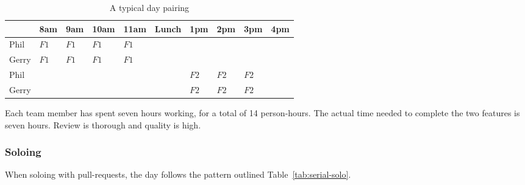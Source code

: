 \documentclass[letterpaper]{article}
\theoremstyle{definition}
\begin{document}
    \begin{table}[h]
        \centering
        \tiny
        \begin{tabular}{ |l|l|l|l|l|l|l|l|l|l| }
            \hline
            & 8am                     & 9am                     & 10am                    & 11am                    & Lunch & 1pm                    & 2pm                    & 3pm                    & 4pm \\
            \hline
            Phil  & \cellcolor{blue!10}$F1$ & \cellcolor{blue!10}$F1$ & \cellcolor{blue!10}$F1$ & \cellcolor{blue!10}$F1$ &       &      &      &      &     \\
            \hline
            Gerry & \cellcolor{blue!10}$F1$ & \cellcolor{blue!10}$F1$ & \cellcolor{blue!10}$F1$ & \cellcolor{blue!10}$F1$ &       &      &      &      &     \\
            \hline
            Phil  &                         &                         &                         &                         &       & \cellcolor{red!10}$F2$ & \cellcolor{red!10}$F2$ & \cellcolor{red!10}$F2$ &     \\
            \hline
            Gerry &                         &                         &                         &                         &       & \cellcolor{red!10}$F2$ & \cellcolor{red!10}$F2$ & \cellcolor{red!10}$F2$ &     \\
            \hline
        \end{tabular}
        \caption{A typical day pairing}
        \label{tab:serial-pair}
    \end{table}

    Each team member has spent seven hours working, for a total of 14 person-hours.
    The actual time needed to complete the two features is seven hours.
    Review is thorough and quality is high.

    \subsubsection{Soloing}\label{subsubsec:serial-soloing}

    When soloing with pull-requests, the day follows the pattern outlined Table~\ref{tab:serial-solo}.
\end{document}
